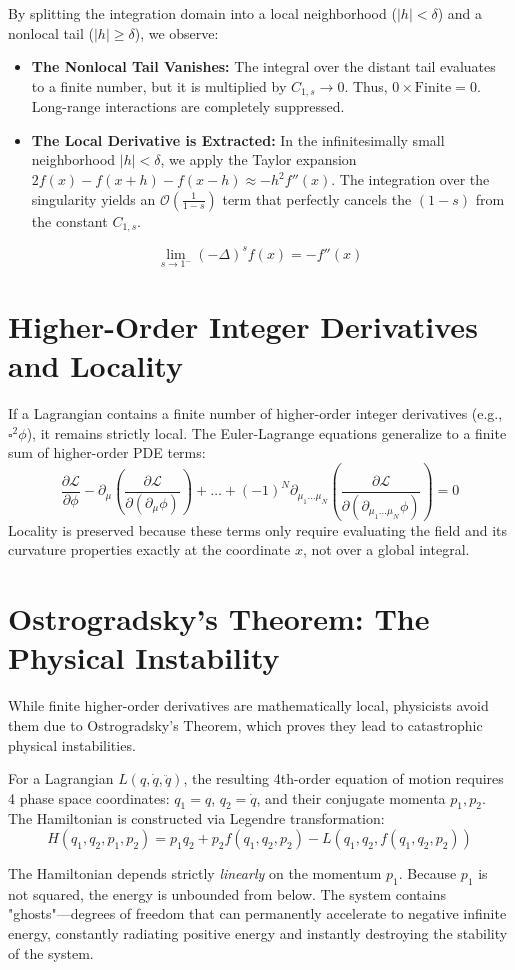 \documentclass[11pt, a4paper]{article}
\begin{document}
By splitting the integration domain into a local neighborhood ($|h| < \delta$) and a nonlocal tail ($|h| \ge \delta$), we observe:
\begin{itemize}
    \item \textbf{The Nonlocal Tail Vanishes:} The integral over the distant tail evaluates to a finite number, but it is multiplied by $C_{1,s} \to 0$. Thus, $0 \times \text{Finite} = 0$. Long-range interactions are completely suppressed.
    \item \textbf{The Local Derivative is Extracted:} In the infinitesimally small neighborhood $|h| < \delta$, we apply the Taylor expansion $2f(x) - f(x+h) - f(x-h) \approx -h^2 f''(x)$. The integration over the singularity yields an $\mathcal{O}\left(\frac{1}{1-s}\right)$ term that perfectly cancels the $(1-s)$ from the constant $C_{1,s}$.
\end{itemize}
\[
\lim_{s \to 1^-} (-\Delta)^s f(x) = -f''(x)
\]

\section{Higher-Order Integer Derivatives and Locality}
If a Lagrangian contains a finite number of higher-order integer derivatives (e.g., $\square^2 \phi$), it remains strictly local. The Euler-Lagrange equations generalize to a finite sum of higher-order PDE terms:
\[
\frac{\partial \mathcal{L}}{\partial \phi} - \partial_\mu \left( \frac{\partial \mathcal{L}}{\partial (\partial_\mu \phi)} \right) + \dots + (-1)^N \partial_{\mu_1 \dots \mu_N} \left( \frac{\partial \mathcal{L}}{\partial (\partial_{\mu_1 \dots \mu_N} \phi)} \right) = 0
\]
Locality is preserved because these terms only require evaluating the field and its curvature properties exactly at the coordinate $x$, not over a global integral.

\section{Ostrogradsky's Theorem: The Physical Instability}
While finite higher-order derivatives are mathematically local, physicists avoid them due to Ostrogradsky's Theorem, which proves they lead to catastrophic physical instabilities.

For a Lagrangian $L(q, \dot{q}, \ddot{q})$, the resulting 4th-order equation of motion requires 4 phase space coordinates: $q_1 = q$, $q_2 = \dot{q}$, and their conjugate momenta $p_1, p_2$. The Hamiltonian is constructed via Legendre transformation:
\[
H(q_1, q_2, p_1, p_2) = p_1 q_2 + p_2 f(q_1, q_2, p_2) - L(q_1, q_2, f(q_1, q_2, p_2))
\]
\begin{tcolorbox}[colback=blue!5!white, colframe=blue!75!black, title=The Fatal Flaw]
The Hamiltonian depends strictly \emph{linearly} on the momentum $p_1$. Because $p_1$ is not squared, the energy is unbounded from below. The system contains "ghosts"—degrees of freedom that can permanently accelerate to negative infinite energy, constantly radiating positive energy and instantly destroying the stability of the system.
\end{tcolorbox}
\end{document}
